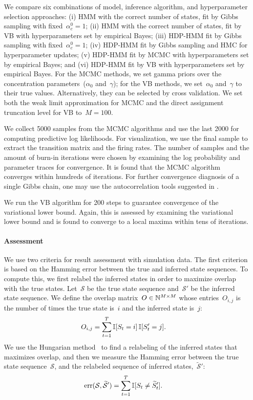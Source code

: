 We compare six combinations of model, inference algorithm, and
hyperparameter selection approaches: (i) HMM with the correct number
of states, fit by Gibbs sampling with fixed~$\alpha_c^0=1$; (ii) HMM
with the correct number of states, fit by VB with hyperparameters set
by empirical Bayes; (iii) HDP-HMM fit by Gibbs sampling with
fixed~$\alpha_c^0=1$; (iv) HDP-HMM fit by Gibbs sampling and HMC for
hyperparameter updates; (v) HDP-HMM fit by MCMC with hyperparameters
set by empirical Bayes; and (vi) HDP-HMM fit by VB with
hyperparameters set by empirical Bayes. For the MCMC methods, we set
gamma priors over the concentration parameters~($\alpha_0$
and~$\gamma$); for the VB methods, we set~$\alpha_0$ and~$\gamma$ to
their true values. Alternatively, they can be selected by cross
validation. We set both the weak limit approximation for MCMC and the
direct assignment truncation level for VB to~${M=100}$.

We collect 5000 samples from the MCMC algorithms and use the last 2000
for computing predictive log likelihoods. For visualization, we use
the final sample to extract the transition matrix and the firing
rates. The number of samples and the amount of burn-in iterations were
chosen by examining the log probability and parameter traces for
convergence. It is found that the MCMC algorithm converges within
hundreds of iterations. For further convergence diagnosis of a single
Gibbs chain, one may use the autocorrelation tools suggested in
\citep{RafteryLewis92,Cowles96}.

We run the VB algorithm for 200 steps to guarantee convergence of the
variational lower bound. Again, this is assessed by examining the
variational lower bound and is found to converge to a local maxima
within tens of iterations.


\paragraph{Assessment} 

We use two criteria for result assessment with simulation data.  The
first criterion is based on the Hamming error between the true and
inferred state sequences. To compute this, we first relabel the
inferred states in order to maximize overlap with the true
states. Let~$\mathcal{S}$ be the true state sequence
and~$\mathcal{S}'$ be the inferred state sequence. We define the
overlap matrix~$O \in \mathbb{N}^{M \times M}$ whose entries~$O_{i,j}$
is the number of times the true state is~$i$ and the inferred state
is~$j$:
\begin{align}
O_{i,j} &= \sum_{t=1}^T \mathbb{I}[S_t=i] \, \mathbb{I}[S_t'=j].
\end{align}
We use the Hungarian method~\citep{kuhn1955hungarian} to find a
relabeling of the inferred states that maximizes overlap, and then we
measure the Hamming error between the true state
sequence~$\mathcal{S}$, and the relabeled sequence of inferred
states,~$\widetilde{\mathcal{S}}'$:
\begin{align}
\label{eq:hamming}
\text{err}(\mathcal{S}, \widetilde{\mathcal{S}}') &= \sum_{t=1}^T \mathbb{I}[S_t \neq \widetilde{S}_t'].
\end{align}

